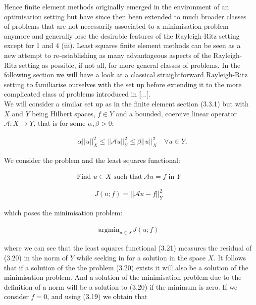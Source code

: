 \documentclass[../draft_1.tex]{subfiles}
\begin{document}
Hence finite element methods originally emerged in the environment of an optimisation setting but have since then been extended to much broader classes of problems that are not necessarily associated to a minimisation problem anymore and generally lose the desirable features of the Rayleigh-Ritz setting except for 1 and 4 (iii). Least squares finite element methods can be seen as a new attempt to re-establishing as many advantageous aspects of the Rayleigh-Ritz setting as possible, if not all, for more general classes of problems. In the following section we will have a look at a classical straightforward Rayleigh-Ritz setting to familiarise ourselves with the set up before extending it to the more complicated class of problems introduced in [...]. 
\smallskip
\\
We will consider a similar set up as in the finite element section (3.3.1) but with $X$ and $Y$ being Hilbert spaces, $f \in Y$ and a bounded, coercive linear operator $\mathcal{A}: X \rightarrow Y$, that is for some  $\alpha, \beta > 0$:
\begin{ceqn}
\begin{align}
\quad \alpha || u ||_X^2 \leq || \mathcal{A} u ||_Y^2 \leq \beta || u ||_X^2 \quad \forall u \in Y.
\end{align} 
\end{ceqn}
We consider the problem and the least squares functional:
\begin{ceqn}
\begin{align}
 \text{Find } u \in X  \text{ such that} \ \mathcal{A} u = f \text{ in } Y	
\end{align}

\begin{align}
J(u; f) = || \mathcal{A} u - f ||_Y^2
\end{align}
\end{ceqn}
which poses the minimisation problem:
 \begin{ceqn}
\begin{align}
\text{argmin}_{u \in X} J(u; f)
\end{align}
\end{ceqn}
where we can see that the least squares functional (3.21) measures the residual of (3.20) in the norm of $Y$ while seeking in for a solution in the space $X$. It follows that if a solution of the the problem (3.20) exists it will also be a solution of the minimisation problem. And a solution of the minimisation problem due to the definition of a norm will be a solution to (3.20) if the minimum is zero. If we consider $f = 0$, and using (3.19) we obtain that 
\end{document}
